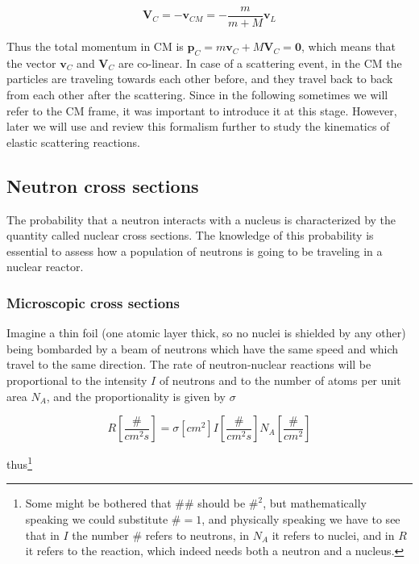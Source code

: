 \begin{equation}
\mathbf{V}_C=-\mathbf{v}_{CM}=-\frac{m}{m+M}\mathbf{v}_L
\end{equation}

Thus the total momentum in CM is $\mathbf{p}_C=m\mathbf{v}_C+M\mathbf{V}_C=\mathbf{0}$, which means that the vector $\mathbf{v}_C$ and $\mathbf{V}_C$ are co-linear. In case of a scattering event, in the CM the particles are traveling towards each other before, and they travel back to back from each other after the scattering. Since in the following sometimes we will refer to the CM frame, it was important to introduce it at this stage. However, later we will use and review this formalism further to study the kinematics of elastic scattering reactions.

\subsection{Neutron cross sections}

The probability that a neutron interacts with a nucleus is characterized by the quantity called nuclear cross sections. The knowledge of this probability is essential to assess how a population of neutrons is going to be traveling in a nuclear reactor. 

\subsubsection{Microscopic cross sections}

Imagine a thin foil (one atomic layer thick, so no nuclei is shielded by any other) being bombarded by a beam of neutrons which have the same speed and which travel to the same direction. The rate of neutron-nuclear reactions will be proportional to the intensity $I$ of neutrons and to the number of atoms per unit area $N_A$, and the proportionality is given by $\sigma$


\begin{equation}
R[\frac{\#}{cm^2s}]=\sigma [cm^2] I [\frac{\#}{cm^2s}] N_A [\frac{\#}{cm^2}]
\end{equation}

thus\footnote{Some might be bothered that $\#\#$ should be $\#^2$, but mathematically speaking we could substitute $\#=1$, and physically speaking we have to see that in $I$ the number $\#$ refers to neutrons, in $N_A$ it refers to nuclei, and in $R$ it refers to the reaction, which indeed needs both a neutron and a nucleus.}

